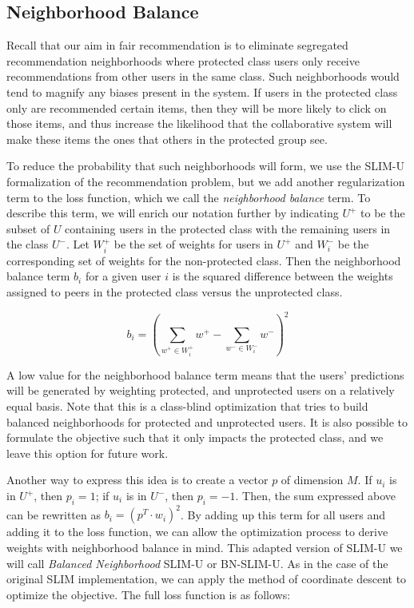 \subsection{Neighborhood Balance}

Recall that our aim in fair recommendation is to eliminate segregated recommendation neighborhoods where protected class users only receive recommendations from other users in the same class. Such neighborhoods would tend to magnify any biases present in the system. If users in the protected class only are recommended certain items, then they will be more likely to click on those items, and thus increase the likelihood that the collaborative system will make these items the ones that others in the protected group see.

To reduce the probability that such neighborhoods will form, we use the SLIM-U formalization of the recommendation problem, but we add another regularization term to the loss function, which we call the \textit{neighborhood balance} term. To describe this term, we will enrich our notation further by indicating $U^+$ to be the subset of $U$ containing users in the protected class with the remaining users in the class $U^-$. Let $W_i^+$ be the set of weights for users in $U^+$ and $W_i^-$ be the corresponding set of weights for the non-protected class. Then the neighborhood balance term $b_i$ for a given user $i$ is the squared difference between the weights assigned to peers in the protected class versus the unprotected class.

\begin{equation}
    b_i = (\sum_{w^+ \in W_i^+}{w^+} - \sum_{w^- \in W_i^-}{w^-})^2
\end{equation}

A low value for the neighborhood balance term means that the users' predictions will be generated by weighting protected, and unprotected users on a relatively equal basis. Note that this is a class-blind optimization that tries to build balanced neighborhoods for protected and unprotected users. It is also possible to formulate the objective such that it only impacts the protected class, and we leave this option for future work.

Another way to express this idea is to create a vector $p$ of dimension $M$. If $u_i$ is in $U^+$, then $p_i = 1$; if $u_i$ is in $U^-$, then $p_i = -1$. Then, the sum expressed above can be rewritten as $b_i = (p^T \cdot w_i)^2$. By adding up this term for all users and adding it to the loss function, we can allow the optimization process to derive weights with neighborhood balance in mind. This adapted version of SLIM-U we will call \textit{Balanced Neighborhood} SLIM-U or BN-SLIM-U. As in the case of the original SLIM implementation, we can apply the method of coordinate descent to optimize the objective. The full loss function is as follows:

